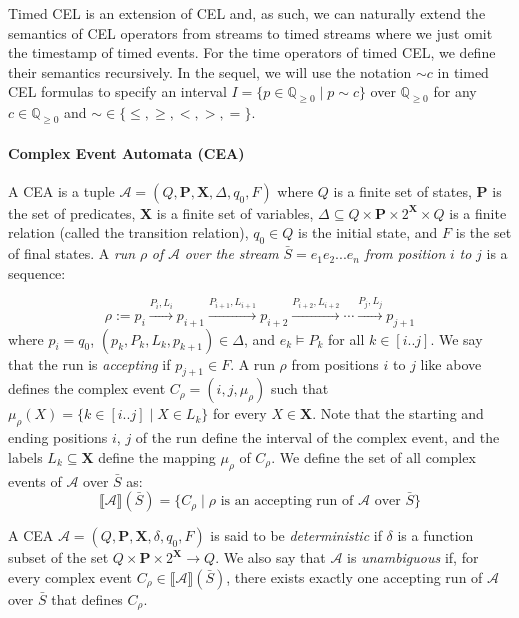 Timed CEL is an extension of CEL and, as such, we can naturally extend the semantics of CEL operators from streams to timed streams where we just omit the timestamp of timed events.
For the time operators of timed CEL, we define their semantics recursively.
In the sequel, we will use the notation $\sim c$ in timed CEL formulas to specify an interval $I = \{p \in \mathbb{Q}_{\geq0} \mid p\sim c \}$ over $\mathbb{Q}_{\geq0}$ for any $c \in \mathbb{Q}_{\geq0}$ and $\sim\in\{\leq,\geq,<,>,=\}$.

\paragraph{Complex Event Automata (CEA)}
A CEA is a tuple $\mathcal{A} = (Q, \textbf{P}, \textbf{X}, \Delta, q_0, F)$ where $Q$ is a finite set of states, \textbf{P} is the set of predicates, \textbf{X} is a finite set of variables, $\Delta\subseteq Q\times\textbf{P}\times 2^\textbf{X}\times Q$ is a finite relation (called the transition relation), $q_0\in Q$ is the initial state, and $F$ is the set of final states.
A \textit{run} $\rho$ \textit{of} $\mathcal{A}$ \textit{over the stream} $\bar{S}=e_1e_2...e_n$ \textit{from position} $i$ \textit{to} $j$ is a sequence:

$$\rho:= p_i \xrightarrow{P_i,L_i} p_{i+1} \xrightarrow{P_{i+1},L_{i+1}} p_{i+2} \xrightarrow{P_{i+2},L_{i+2}} \cdots \xrightarrow{P_j,L_j} p_{j+1}$$
where $p_i = q_0$, $(p_k,P_k,L_k,p_{k+1})\in\Delta$, and $e_k \vDash P_k$ for all $k\in [i..j]$. 
We say that the run is \textit{accepting} if $p_{j+1} \in F$. 
A run $\rho$ from positions $i$ to $j$ like above defines the complex event $C_\rho = (i,j,\mu_\rho)$ such that $\mu_\rho(X) = \{k\in [i..j] \mid X\in L_k \}$ for every $X\in\textbf{X}$. 
Note that the starting and ending positions $i$, $j$ of the run define the interval of the complex event, and the labels $L_k\subseteq \textbf{X}$ define the mapping $\mu_\rho$ of $C_\rho$. 
We define the set of all complex events of $\mathcal{A}$ over $\bar{S}$ as:
$$\llbracket\mathcal{A}\rrbracket(\bar{S}) = \{C_\rho \mid \rho \text{ is an accepting run of } \mathcal{A} \text{ over } \bar{S}  \}$$

A CEA $\mathcal{A} = (Q, \textbf{P}, \textbf{X}, \delta, q_0, F)$ is said to be \textit{deterministic} if $\delta$ is a function subset of the set $Q\times \textbf{P} \times 2^\textbf{X} \rightarrow Q$. We also say that $\mathcal{A}$ is \textit{unambiguous} if, for every complex event $C_\rho \in \llbracket\mathcal{A}\rrbracket(\bar{S})$, there exists exactly one accepting run of $\mathcal{A}$ over $\bar{S}$ that defines $C_\rho$. 
